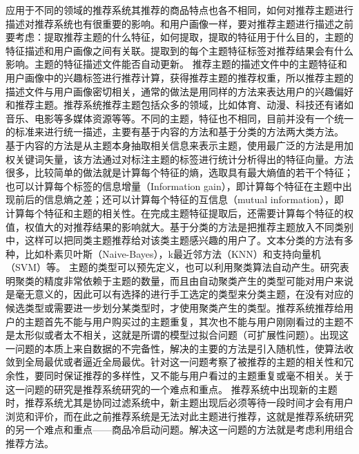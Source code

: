   应用于不同的领域的推荐系统其推荐的商品特点也各不相同，如何对推荐主题进行描述对推荐系统也有很重要的影响。和用户画像一样，要对推荐主题进行描述之前要考虑：提取推荐主题的什么特征，如何提取，提取的特征用于什么目的，主题的特征描述和用户画像之间有关联。提取到的每个主题特征标签对推荐结果会有什么影响。主题的特征描述文件能否自动更新。
  推荐主题的描述文件中的主题特征和用户画像中的兴趣标签进行推荐计算，获得推荐主题的推荐权重，所以推荐主题的描述文件与用户画像密切相关，通常的做法是用同样的方法来表达用户的兴趣偏好和推荐主题。推荐系统推荐主题包括众多的领域，比如体育、动漫、科技还有诸如音乐、电影等多媒体资源等等。不同的主题，特征也不相同，目前并没有一个统一的标准来进行统一描述，主要有基于内容的方法和基于分类的方法两大类方法。 基于内容的方法是从主题本身抽取相关信息来表示主题，使用最广泛的方法是用加权关键词矢量，该方法通过对标注主题的标签进行统计分析得出的特征向量。方法很多，比较简单的做法就是计算每个特征的熵，选取具有最大熵值的若干个特征；也可以计算每个标签的信息增量（Information gain），即计算每个特征在主题中出现前后的信息熵之差；还可以计算每个特征的互信息（mutual information），即计算每个特征和主题的相关性。在完成主题特征提取后，还需要计算每个特征的权值，权值大的对推荐结果的影响就大。基于分类的方法是把推荐主题放入不同类别中，这样可以把同类主题推荐给对该类主题感兴趣的用户了。文本分类的方法有多种，比如朴素贝叶斯（Naive-Bayes），k最近邻方法（KNN）和支持向量机（SVM）等。 主题的类型可以预先定义，也可以利用聚类算法自动产生。研究表明聚类的精度非常依赖于主题的数量，而且由自动聚类产生的类型可能对用户来说是毫无意义的，因此可以有选择的进行手工选定的类型来分类主题，在没有对应的候选类型或需要进一步划分某类型时，才使用聚类产生的类型。推荐系统推荐给用户的主题首先不能与用户购买过的主题重复，其次也不能与用户刚刚看过的主题不是太形似或者太不相关，这就是所谓的模型过拟合问题（可扩展性问题）。出现这一问题的本质上来自数据的不完备性，解决的主要的方法是引入随机性，使算法收敛到全局最优或者逼近全局最优。针对这一问题考察了被推荐的主题的相关性和冗余性，要同时保证推荐的多样性，又不能与用户看过的主题重复或毫不相关。关于这一问题的研究是推荐系统研究的一个难点和重点。 推荐系统中出现新的主题时，推荐系统尤其是协同过滤系统中，新主题出现后必须等待一段时间才会有用户浏览和评价，而在此之前推荐系统是无法对此主题进行推荐，这就是推荐系统研究的另一个难点和重点——商品冷启动问题。解决这一问题的方法就是考虑利用组合推荐方法。
  
